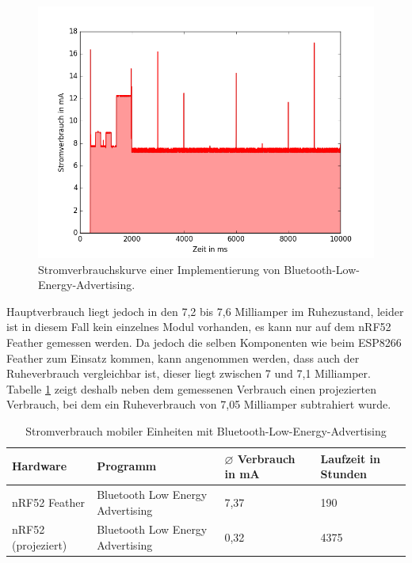 \begin{figure}[h!]
  \centering
	\includegraphics[width=\textwidth]{plots/blue.png}
  \caption{Stromverbrauchskurve einer Implementierung von Bluetooth-Low-Energy-Advertising.}
  \label{fig:blue}
\end{figure}

Hauptverbrauch liegt jedoch in den 7,2 bis 7,6 Milliamper im Ruhezustand, leider ist in diesem Fall kein einzelnes Modul vorhanden, es kann nur auf dem nRF52 Feather gemessen werden.
Da jedoch die selben Komponenten wie beim ESP8266 Feather zum Einsatz kommen, kann angenommen werden, dass auch der Ruheverbrauch vergleichbar ist, dieser liegt zwischen 7 und 7,1 Milliamper.
Tabelle \ref{table:blueina} zeigt deshalb neben dem gemessenen Verbrauch einen projezierten Verbrauch, bei dem ein Ruheverbrauch von 7,05 Milliamper subtrahiert wurde.

\begin{table}[h!]
	\centering
	\caption{Stromverbrauch mobiler Einheiten mit Bluetooth-Low-Energy-Advertising}
	\label{table:blueina}
	\begin{tabular}{p{3.5cm}|p{5cm}|p{2.5cm}|p{2.5cm}}
		Hardware & Programm & $\varnothing$ Verbrauch in mA & Laufzeit in Stunden\\
		\hline
		nRF52 Feather & Bluetooth Low Energy Advertising & 7,37 & 190\\
		nRF52 (projeziert) & Bluetooth Low Energy Advertising & 0,32 & 4375\\
	\end{tabular}
\end{table}

